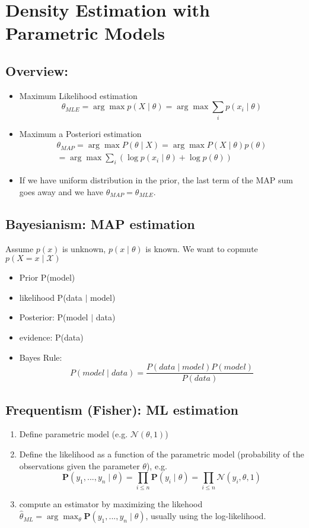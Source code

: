 \section{Density Estimation with Parametric Models}
\subsection*{Overview: }
\begin{itemize}
	\item Maximum Likelihood estimation \\
	$$\theta_{MLE} = \arg\max p(X\mid\theta) = \arg \max \sum_i p(x_i\mid\theta)$$
	\item Maximum a Posteriori estimation \\
	\begin{multline*}	
	\theta_{MAP} = \arg\max P(\theta\mid X) = \arg\max P(X\mid\theta)p(\theta) \\
	= \arg \max \sum_i(\log{p(x_i\mid \theta)} + \log p(\theta))
	\end{multline*}
	\item If we have uniform distribution in the prior, the last term of the MAP sum goes away and we have $\theta_{MAP} = \theta_{MLE}$.
\end{itemize}

\subsection{Bayesianism: MAP estimation}
Assume $p(x)$ is unknown, $p(x\mid \theta)$ is known. We want to copmute $p(X=x \mid \mathcal X)$
\begin{itemize}
	\item Prior P(model)
	\item likelihood P(data $\mid$ model)
	\item Posterior: P(model $\mid$ data)
	\item evidence: P(data)
	\item Bayes Rule: 
	$$P(model \mid data) = \frac{P(data\mid model)P(model)}{P(data)}$$
\end{itemize}

\subsection{Frequentism (Fisher): ML estimation}
\begin{enumerate}
	\item Define parametric model (e.g. $\mathcal N(\theta, 1)$)
	\item Define the likelihood as a function of the parametric model (probability of the observations given the parameter $\theta$), e.g.
	$$
		\mathbf P(y_1, ..., y_n \mid \theta) = \prod_{i\leq n}\mathbf P(y_i\mid \theta) = \prod_{i\leq n}\mathcal N(y_i, \theta, 1)
	$$
	\item compute an estimator by maximizing the likehood $\hat\theta_{ML} = \arg\max_\theta \mathbf P(y_1, ..., y_n \mid \theta)$, usually using the log-likelihood.
\end{enumerate}


